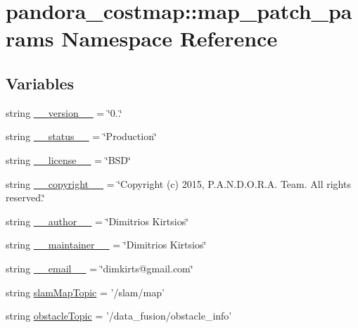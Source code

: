 \hypertarget{namespacepandora__costmap_1_1map__patch__params}{\section{pandora\-\_\-costmap\-:\-:map\-\_\-patch\-\_\-params \-Namespace \-Reference}
\label{namespacepandora__costmap_1_1map__patch__params}
}
\subsection*{\-Variables}
\begin{DoxyCompactItemize}
\item 
string \hyperlink{namespacepandora__costmap_1_1map__patch__params_a2b2331433a58bc45d65f45cd41ec4e00}{\-\_\-\-\_\-version\-\_\-\-\_\-} = \char`\"{}0..\char`\"{}
\item 
string \hyperlink{namespacepandora__costmap_1_1map__patch__params_ad3666d8aab9db2eb97e372c66462f232}{\-\_\-\-\_\-status\-\_\-\-\_\-} = \char`\"{}\-Production\char`\"{}
\item 
string \hyperlink{namespacepandora__costmap_1_1map__patch__params_a21b69207f740eb57c225b2b4b25ea829}{\-\_\-\-\_\-license\-\_\-\-\_\-} = \char`\"{}\-B\-S\-D\char`\"{}
\item 
string \hyperlink{namespacepandora__costmap_1_1map__patch__params_aa6b0af3d4bd88fed9f373d533b48736c}{\-\_\-\-\_\-copyright\-\_\-\-\_\-} = \char`\"{}\-Copyright (c) 2015, \-P.\-A.\-N.\-D.\-O.\-R.\-A. \-Team. \-All rights reserved.\char`\"{}
\item 
string \hyperlink{namespacepandora__costmap_1_1map__patch__params_a1abf0e0f7505b406ed5a57ca2f7ff871}{\-\_\-\-\_\-author\-\_\-\-\_\-} = \char`\"{}\-Dimitrios \-Kirtsios\char`\"{}
\item 
string \hyperlink{namespacepandora__costmap_1_1map__patch__params_a292f45b6e797b1a13029876440f58fb8}{\-\_\-\-\_\-maintainer\-\_\-\-\_\-} = \char`\"{}\-Dimitrios \-Kirtsios\char`\"{}
\item 
string \hyperlink{namespacepandora__costmap_1_1map__patch__params_acbae9fb47a4292aa8c58a4cbd6f5da50}{\-\_\-\-\_\-email\-\_\-\-\_\-} = \char`\"{}dimkirts@gmail.\-com\char`\"{}
\item 
string \hyperlink{namespacepandora__costmap_1_1map__patch__params_aa01557cea0c3898c25909131d7725989}{slam\-Map\-Topic} = '/slam/map'
\item 
string \hyperlink{namespacepandora__costmap_1_1map__patch__params_a1d6c4fd52a7c27d192c98dc891a31350}{obstacle\-Topic} = '/data\-\_\-fusion/obstacle\-\_\-info'

\end{DoxyCompactItemize}
